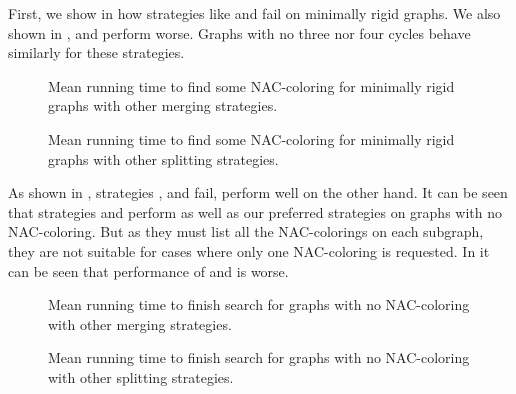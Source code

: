 First, we show in 
how strategies like \Log{} and \PromisingCycles{} fail on minimally rigid graphs.
We also shown in ,
\KernighanLin{} and \Cuts{} perform worse.
%
Graphs with no three nor four cycles behave similarly for these strategies.
%
\begin{figure}[thbp]
	\centering
	\scalebox{\BenchFigureScale}{}
	\caption[Other merging strategies for minimally rigid graphs]{
		Mean running time to find some NAC-coloring for minimally rigid graphs with other merging strategies.}%
	\label{fig:graph_mimimally_rigid_failing_merging_first_runtime}
\end{figure}%
\begin{figure}[thbp]
	\centering
	\scalebox{\BenchFigureScale}{}
	\caption[Other splitting strategies for minimally rigid graphs]{
		Mean running time to find some NAC-coloring for minimally rigid graphs with other splitting strategies.}%
	\label{fig:graph_mimimally_rigid_failing_split_first_runtime}
\end{figure}%


As shown in ,
strategies \Log{}, \SortedBits{} and \MinMax{} fail,
\PromisingCycles{} perform well on the other hand.
%
It can be seen that strategies \SortedSize{} and \Score{} perform
as well as our preferred strategies on graphs with no NAC-coloring.
But as they must list all the NAC-colorings on each subgraph,
they are not suitable for cases where only one NAC-coloring is requested.
%
In 
it can be seen that performance of \KernighanLin{} and \Cuts{} is worse.
%
\begin{figure}[thbp]
	\centering
	\scalebox{\BenchFigureScale}{}
	\caption[Other merging strategies for graphs with no NAC-coloring]{
		Mean running time to finish search for graphs with no NAC-coloring with other merging strategies.}%
	\label{fig:graph_no_nac_coloring_generated_rigid_failing_merging_first_runtime}
\end{figure}%
\begin{figure}[thbp]
	\centering
	\scalebox{\BenchFigureScale}{}
	\caption[Other splitting strategies for graphs with no NAC-coloring]{
		Mean running time to finish search for graphs with no NAC-coloring with other splitting strategies.}%
	\label{fig:graph_no_nac_coloring_generated_rigid_failing_split_first_runtime}
\end{figure}%


